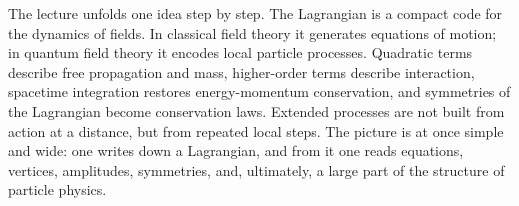 The lecture unfolds one idea step by step. The Lagrangian is a compact code for the dynamics of fields. In classical field theory it generates equations of motion; in quantum field theory it encodes local particle processes. Quadratic terms describe free propagation and mass, higher-order terms describe interaction, spacetime integration restores energy-momentum conservation, and symmetries of the Lagrangian become conservation laws. Extended processes are not built from action at a distance, but from repeated local steps. The picture is at once simple and wide: one writes down a Lagrangian, and from it one reads equations, vertices, amplitudes, symmetries, and, ultimately, a large part of the structure of particle physics.